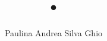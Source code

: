 \documentclass[letterpaper,oneside,12pt,spanish]{book}
\title{•}
\author{Paulina Andrea Silva Ghio}
\begin{document}
\frontmatter
 
%
\newpage 
% 
\newpage 
 
\markboth{}{}
\newpage
\tableofcontents 
\newpage
\listoffigures
\newpage
\listoftables
\newpage	
\renewcommand{\sectionmark}[1]{\markright{\thesection\ #1}}

\mainmatter

\newpage

\newpage

\newpage
%
\newpage
%
\newpage
%
\newpage
%




\appendix
%
%
\end{document}
